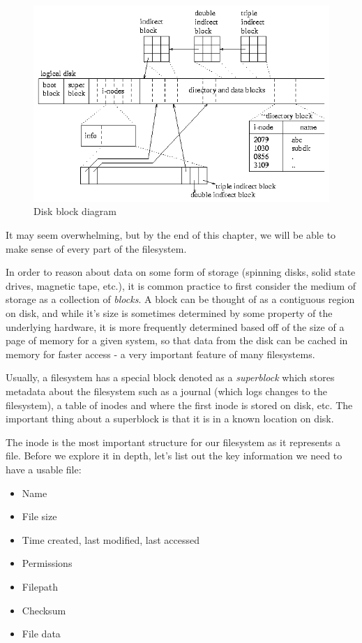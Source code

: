 \begin{figure}[htbp]
\centering
\includegraphics[width=.8\textwidth]{filesystems/images/disk.gif}
\caption{Disk block diagram}
\end{figure}

It may seem overwhelming, but by the end of this chapter, we will be able to make sense of every part of the filesystem.

In order to reason about data on some form of storage (spinning disks, solid state drives, magnetic tape, etc.), it is common practice to first consider the medium of storage as a collection of \emph{blocks}. A block can be thought of as a contiguous region on disk, and while it's size is sometimes determined by some property of the underlying hardware, it is more frequently determined based off of the size of a page of memory for a given system, so that data from the disk can be cached in memory for faster access - a very important feature of many filesystems.

Usually, a filesystem has a special block denoted as a \emph{superblock} which stores metadata about the filesystem such as a journal (which logs changes to the filesystem), a table of inodes and where the first inode is stored on disk, etc. The important thing about a superblock is that it is in a known location on disk.

The inode is the most important structure for our filesystem as it represents a file. Before we explore it in depth, let's list out the key information we need to have a usable file:

\begin{itemize}
\tightlist
  \item Name
  \item File size
  \item Time created, last modified, last accessed
  \item Permissions
  \item Filepath
  \item Checksum
  \item File data
\end{itemize}

